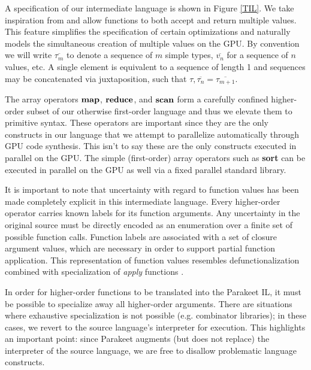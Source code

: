 \documentclass[preprint]{sigplanconf}
\begin{document}
A specification of our intermediate language is shown in Figure \ref{TIL}. We take inspiration from \cite{Bol09} and allow functions to both accept and return multiple values. This feature simplifies the specification of certain optimizations and naturally models the simultaneous creation of multiple values on the GPU. By convention we will write $\overline{\tau_m}$ to denote a sequence of $m$ simple types, $\overline{v_n}$ for a sequence  of $n$ values, etc. A single element is equivalent to a sequence of length 1 and sequences may be concatenated via juxtaposition, such that $\tau, \overline{\tau_n} = \overline{\tau_{m+1}}$.

The array operators $\mbox{\textbf{map}}$, $\mbox{\textbf{reduce}}$, and $\mbox{\textbf{scan}}$ form a carefully confined higher-order subset of our otherwise first-order language and thus we elevate them to primitive syntax. These operators are important since they are the only constructs in our language that we attempt to parallelize automatically through GPU code synthesis. This isn't to say these are the only constructs executed in parallel on the GPU. The simple (first-order) array operators such as \textbf{sort} can be executed in parallel on the GPU as well via a fixed parallel standard library. 


It is important to note that uncertainty with regard to function values has been made completely explicit in this intermediate language. Every higher-order operator carries known labels for its function arguments. Any uncertainty in the original source must be directly encoded as an enumeration over a finite set of possible function calls. Function labels are associated with a set of closure argument values, which are necessary in order to support partial function application. This representation of function values resembles defunctionalization combined with specialization of \textit{apply} functions \cite{Tolmach98}. 

In order for higher-order functions to be translated into the Parakeet IL, it must be possible to specialize away all higher-order arguments. There are situations where exhaustive specialization is not possible (e.g. combinator libraries); in these cases, we revert to the source language's interpreter for
execution. This highlights an important point: since Parakeet augments (but does not replace) the interpreter of the source language, we are free to disallow problematic language constructs.
\end{document}
